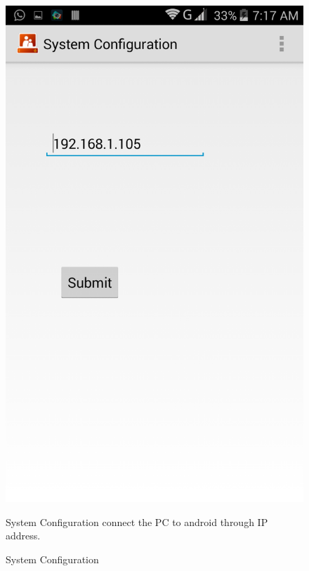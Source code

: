\begin{figure}
\begin{center}
\scalebox{0.25}
{\includegraphics{system.png}}
\caption{System Configuration}  
\end{center}
System Configuration connect the PC to android through IP address. 
\end{figure}

